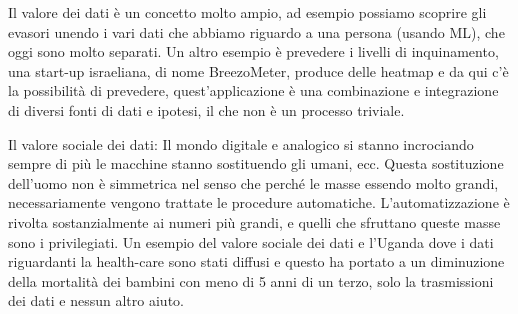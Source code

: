 \documentclass[a4page, 11pt]{article}
\begin{document}
Il valore dei dati è un concetto molto ampio, ad esempio possiamo
scoprire gli evasori unendo i vari dati che abbiamo riguardo a una
persona (usando ML), che oggi sono molto separati. Un altro esempio è
prevedere i livelli di inquinamento, una start-up israeliana, di nome
BreezoMeter, produce delle heatmap e da qui c'è la possibilità di
prevedere, quest'applicazione è una combinazione e integrazione di
diversi fonti di dati e ipotesi, il che non è un processo triviale.

Il valore sociale dei dati: Il mondo digitale e analogico si stanno
incrociando sempre di più le macchine stanno sostituendo gli umani, ecc.
Questa sostituzione dell'uomo non è simmetrica nel senso che perché le
masse essendo molto grandi, necessariamente vengono trattate le
procedure automatiche. L'automatizzazione è rivolta sostanzialmente ai
numeri più grandi, e quelli che sfruttano queste masse sono i
privilegiati. Un esempio del valore sociale dei dati e l'Uganda dove i
dati riguardanti la health-care sono stati diffusi e questo ha portato a
un diminuzione della mortalità dei bambini con meno di 5 anni di un
terzo, solo la trasmissioni dei dati e nessun altro aiuto.
\end{document}
